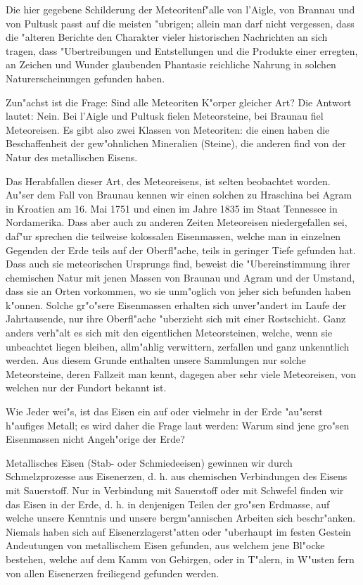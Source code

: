 \documentclass[a4paper, 11pt, oneside, german]{article}
\begin{document}
Die hier gegebene Schilderung der Meteoritenf"alle von l'Aigle, von Brannau und von Pultusk passt auf die meisten "ubrigen; allein man darf nicht vergessen, dass die "alteren Berichte den Charakter vieler historischen Nachrichten an sich tragen, dass "Ubertreibungen und Entstellungen und die Produkte einer erregten, an Zeichen und Wunder glaubenden Phantasie reichliche Nahrung in solchen Naturerscheinungen gefunden haben.

Zun"achst ist die Frage: Sind alle Meteoriten K"orper gleicher Art? Die Antwort lautet: Nein. Bei l'Aigle und Pultusk fielen Meteorsteine, bei Braunau fiel Meteoreisen. Es gibt also zwei Klassen von Meteoriten: die einen haben die Beschaffenheit der gew"ohnlichen Mineralien (Steine), die anderen find von der Natur des metallischen Eisens.

Das Herabfallen dieser Art, des Meteoreisens, ist selten beobachtet worden. Au"ser dem Fall von Braunau kennen wir einen solchen zu Hraschina bei Agram in Kroatien am 16. Mai 1751 und einen im Jahre 1835 im Staat Tennessee in Nordamerika. Dass aber auch zu anderen Zeiten Meteoreisen niedergefallen sei, daf"ur sprechen die teilweise kolossalen Eisenmassen, welche man in einzelnen Gegenden der Erde teils auf der Oberfl"ache, teils in geringer Tiefe gefunden hat. Dass auch sie meteorischen Ursprungs find, beweist die "Ubereinstimmung ihrer chemischen Natur mit jenen Massen von Braunau und Agram und der Umstand, dass sie an Orten vorkommen, wo sie unm"oglich von jeher sich befunden haben k"onnen. Solche gr"o"sere Eisenmassen erhalten sich unver"andert im Laufe der Jahrtausende, nur ihre Oberfl"ache "uberzieht sich mit einer Rostschicht. Ganz anders verh"alt es sich mit den eigentlichen Meteorsteinen, welche, wenn sie unbeachtet liegen bleiben, allm"ahlig verwittern, zerfallen und ganz unkenntlich werden. Aus diesem Grunde enthalten unsere Sammlungen nur solche Meteorsteine, deren Fallzeit man kennt, dagegen aber sehr viele Meteoreisen, von welchen nur der Fundort bekannt ist.

Wie Jeder wei"s, ist das Eisen ein auf oder vielmehr in der Erde "au"serst h"aufiges Metall; es wird daher die Frage laut werden: Warum sind jene gro"sen Eisenmassen nicht Angeh"orige der Erde?

Metallisches Eisen (Stab- oder Schmiedeeisen) gewinnen wir durch Schmelzprozesse aus Eisenerzen, d. h. aus chemischen Verbindungen des Eisens mit Sauerstoff. Nur in Verbindung mit Sauerstoff oder mit Schwefel finden wir das Eisen in der Erde, d. h. in denjenigen Teilen der gro"sen Erdmasse, auf welche unsere Kenntnis und unsere bergm"annischen Arbeiten sich beschr"anken. Niemals haben sich auf Eisenerzlagerst"atten oder "uberhaupt im festen Gestein Andeutungen von metallischem Eisen gefunden, aus welchem jene Bl"ocke bestehen, welche auf dem Kamm von Gebirgen, oder in T"alern, in W"usten fern von allen Eisenerzen freiliegend gefunden werden.
\end{document}
